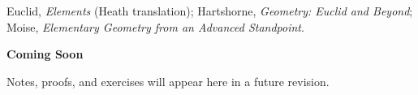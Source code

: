 \begin{remark*}
Euclid, \textit{Elements} (Heath translation);
Hartshorne, \textit{Geometry: Euclid and Beyond};
Moise, \textit{Elementary Geometry from an Advanced Standpoint}.
\end{remark*}

\vspace{1em}
\begin{tcolorbox}[
  colback=gray!6, colframe=gray!40, arc=2pt,
  left=8pt, right=8pt, top=6pt, bottom=6pt,
  title={\small\textbf{Status: Planned}},
  fonttitle=\small\bfseries
]
\begin{center}\Large\bfseries Coming Soon\end{center}
\vspace{6pt}
\noindent Notes, proofs, and exercises will appear here in a future revision.
\end{tcolorbox}

% 
% 
% 
% 
% 
% 
% 
% 
